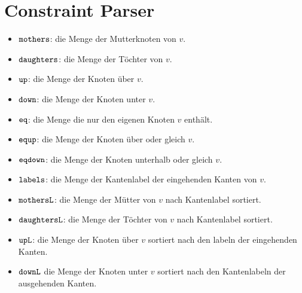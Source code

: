 \section{Constraint Parser}\label{cpmengen}
\begin{itemize}
\item $\mathtt{mothers}$: die Menge der Mutterknoten von $v$. 
\item $\mathtt{daughters}$: die Menge der T\"ochter von $v$.
\item $\mathtt{up}$: die Menge der Knoten \"uber $v$.
\item $\mathtt{down}$: die Menge der Knoten unter $v$.
\item $\mathtt{eq}$: die Menge die nur den eigenen Knoten $v$ enth\"alt.
\item $\mathtt{equp}$: die Menge der Knoten \"uber oder gleich $v$.
\item $\mathtt{eqdown}$: die Menge der Knoten unterhalb oder gleich $v$.
\item $\mathtt{labels}$: die Menge der Kantenlabel der eingehenden Kanten
  von $v$.
\item $\mathtt{mothersL}$: die Menge der M\"utter von $v$ nach
  Kantenlabel sortiert.
\item $\mathtt{daughtersL}$: die Menge der T\"ochter von $v$ nach
  Kantenlabel sortiert.
\item $\mathtt{upL}$: die Menge der Knoten \"uber $v$ sortiert nach den
  labeln der eingehenden Kanten.
\item $\mathtt{downL}$ die Menge der Knoten unter $v$ sortiert nach den
  Kantenlabeln der ausgehenden Kanten.
\end{itemize}